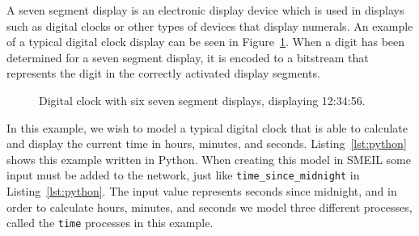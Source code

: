 A seven segment display is an electronic display device which is used in displays such as digital clocks or other types of devices that display numerals. An example of a typical digital clock display can be seen in Figure~\ref{fig:6_displays}. When a digit has been determined for a seven segment display, it is encoded to a bitstream that represents the digit in the correctly activated display segments.
\begin{figure}[!ht]
  \begin{center}
  \end{center}
  \caption{Digital clock with six seven segment displays, displaying 12:34:56.}
  \label{fig:6_displays}
\end{figure}
In this example, we wish to model a typical digital clock that is able to calculate and display the current time in hours, minutes, and seconds. Listing~\ref{lst:python} shows this example written in Python.
When creating this model in SMEIL some input must be added to the network, just like \texttt{time\_since\_midnight} in Listing~\ref{lst:python}. The input value represents seconds since midnight, and in order to calculate hours, minutes, and seconds we model three different processes, called the \texttt{time} processes in this example.

